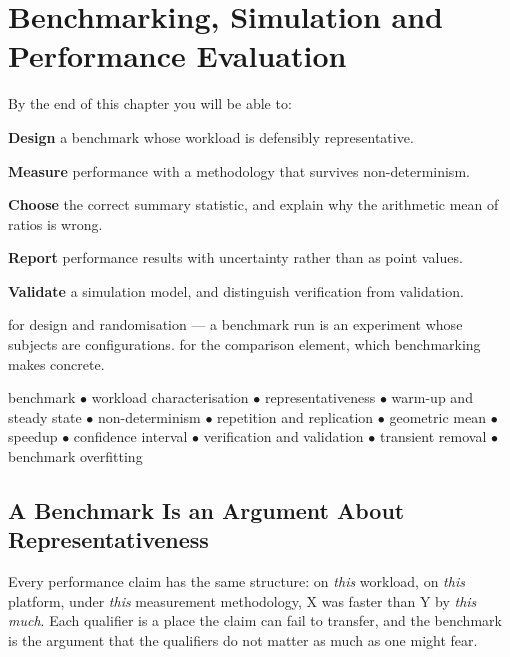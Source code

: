 \chapter{Benchmarking, Simulation and Performance Evaluation}\label{ch:benchmarking}

\begin{outcomes}
By the end of this chapter you will be able to:
\begin{tight}
  \item \textbf{Design} a benchmark whose workload is defensibly representative.
  \item \textbf{Measure} performance with a methodology that survives
    non-determinism.
  \item \textbf{Choose} the correct summary statistic, and explain why the
    arithmetic mean of ratios is wrong.
  \item \textbf{Report} performance results with uncertainty rather than as
    point values.
  \item \textbf{Validate} a simulation model, and distinguish verification from
    validation.
\end{tight}
\end{outcomes}

\begin{prereq}
 for design and randomisation --- a benchmark run is an
experiment whose subjects are configurations.  for the
comparison element, which benchmarking makes concrete.
\end{prereq}

\begin{keyterms}
benchmark $\bullet$ workload characterisation $\bullet$ representativeness
$\bullet$ warm-up and steady state $\bullet$ non-determinism $\bullet$
repetition and replication $\bullet$ geometric mean $\bullet$ speedup
$\bullet$ confidence interval $\bullet$ verification and validation $\bullet$
transient removal $\bullet$ benchmark overfitting
\end{keyterms}

\section{A Benchmark Is an Argument About Representativeness}

Every performance claim has the same structure: on \emph{this} workload, on
\emph{this} platform, under \emph{this} measurement methodology, X was faster
than Y by \emph{this much}. Each qualifier is a place the claim can fail to
transfer, and the benchmark is the argument that the qualifiers do not matter
as much as one might fear.


